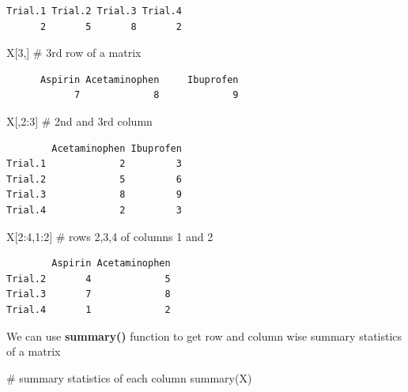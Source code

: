 \documentclass[
  letterpaper,
  DIV=11,
  numbers=noendperiod]{scrreprt}
\newenvironment{Shaded}{\begin{snugshade}}{\end{snugshade}}
\newcommand{\CommentTok}[1]{\textcolor[rgb]{0.37,0.37,0.37}{#1}}
\newcommand{\DecValTok}[1]{\textcolor[rgb]{0.68,0.00,0.00}{#1}}
\newcommand{\FunctionTok}[1]{\textcolor[rgb]{0.28,0.35,0.67}{#1}}
\newcommand{\NormalTok}[1]{\textcolor[rgb]{0.00,0.23,0.31}{#1}}
\newcommand{\SpecialCharTok}[1]{\textcolor[rgb]{0.37,0.37,0.37}{#1}}
\begin{document}
\begin{verbatim}
Trial.1 Trial.2 Trial.3 Trial.4 
      2       5       8       2 
\end{verbatim}

\begin{Shaded}
\begin{Highlighting}[]
\NormalTok{X[}\DecValTok{3}\NormalTok{,]  }\CommentTok{\# 3rd row of a matrix}
\end{Highlighting}
\end{Shaded}

\begin{verbatim}
      Aspirin Acetaminophen     Ibuprofen 
            7             8             9 
\end{verbatim}

\begin{Shaded}
\begin{Highlighting}[]
\NormalTok{X[,}\DecValTok{2}\SpecialCharTok{:}\DecValTok{3}\NormalTok{] }\CommentTok{\# 2nd and 3rd column}
\end{Highlighting}
\end{Shaded}

\begin{verbatim}
        Acetaminophen Ibuprofen
Trial.1             2         3
Trial.2             5         6
Trial.3             8         9
Trial.4             2         3
\end{verbatim}

\begin{Shaded}
\begin{Highlighting}[]
\NormalTok{X[}\DecValTok{2}\SpecialCharTok{:}\DecValTok{4}\NormalTok{,}\DecValTok{1}\SpecialCharTok{:}\DecValTok{2}\NormalTok{]     }\CommentTok{\# rows 2,3,4 of columns 1 and 2}
\end{Highlighting}
\end{Shaded}

\begin{verbatim}
        Aspirin Acetaminophen
Trial.2       4             5
Trial.3       7             8
Trial.4       1             2
\end{verbatim}

We can use \textbf{summary()} function to get row and column wise
summary statistics of a matrix

\begin{Shaded}
\begin{Highlighting}[]
\CommentTok{\# summary statistics of each column}
\FunctionTok{summary}\NormalTok{(X)}
\end{Highlighting}
\end{Shaded}
\end{document}
